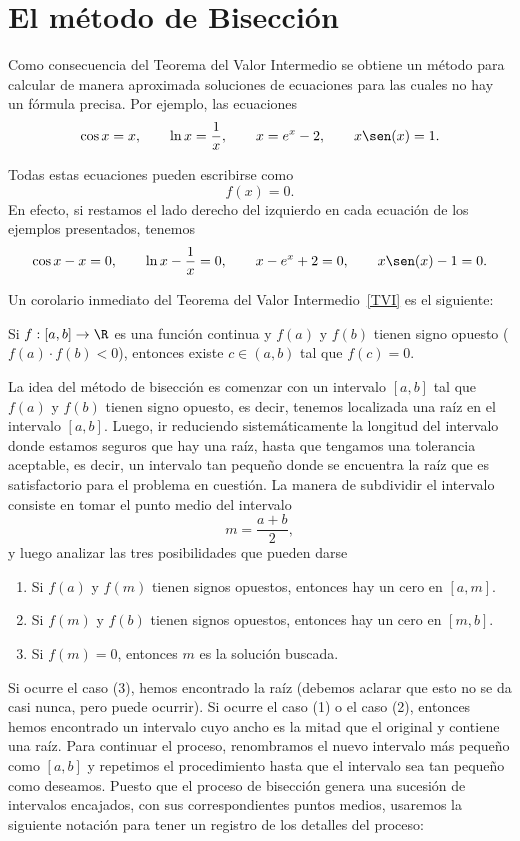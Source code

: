 \section{El método de Bisección}

Como consecuencia del Teorema del Valor Intermedio se obtiene un método para calcular de manera aproximada soluciones de ecuaciones para las cuales no hay un fórmula precisa.
Por ejemplo, las ecuaciones
\[
\cos x = x,\qquad
\ln x = \frac 1x,\qquad
x = e^x-2, \qquad
x\sen(x)=1.
\]

Todas estas ecuaciones pueden escribirse como
\begin{equation}\label{eq:ecuacion1}
f(x) = 0.
\end{equation}
En efecto, si restamos el lado derecho del izquierdo en cada ecuación de los ejemplos presentados, tenemos
\[
\cos x - x=0,\qquad
\ln x - \frac 1x=0,\qquad
x - e^x + 2=0, \qquad
x\sen(x)-1=0.
\]

Un corolario inmediato del Teorema del Valor Intermedio~\ref{TVI} es el siguiente:

\begin{corollary}
Si $f:[a,b] \to \R$ es una función continua y $f(a)$ y $f(b)$ tienen signo opuesto ($f(a)\cdot f(b) < 0$), entonces existe $c \in (a,b)$ tal que $f(c) = 0$.
\end{corollary}

La idea del método de bisección es comenzar con un intervalo $[a,b]$ tal que $f(a)$ y $f(b)$ tienen signo opuesto, es decir, tenemos localizada una raíz en el intervalo $[a,b]$. Luego, ir reduciendo sistemáticamente la longitud del intervalo donde estamos seguros que hay una raíz, hasta que tengamos una tolerancia aceptable, es decir, un intervalo tan pequeño donde se encuentra la raíz que es satisfactorio para el problema en cuestión.
La manera de subdividir el intervalo consiste en tomar el punto medio del intervalo 
\[
m = \frac{a+b}2,
\]
y luego analizar las tres posibilidades que pueden darse
\begin{enumerate}[(1)]
\item Si $f(a)$ y $f(m)$ tienen signos opuestos, entonces hay un cero en $[a,m]$.
\item Si $f(m)$ y $f(b)$ tienen signos opuestos, entonces hay un cero en $[m,b]$.
\item Si $f(m) = 0$, entonces $m$ es la solución buscada.
\end{enumerate}

Si ocurre el caso (3), hemos encontrado la raíz (debemos aclarar que esto no se da casi nunca, pero puede ocurrir).
Si ocurre el caso (1) o el caso (2), entonces hemos encontrado un intervalo cuyo ancho es la mitad que el original y contiene una raíz. Para continuar el proceso, renombramos el nuevo intervalo más pequeño como $[a,b]$ y repetimos el procedimiento hasta que el intervalo sea tan pequeño como deseamos. Puesto que el proceso de bisección genera una sucesión de intervalos encajados, con sus correspondientes puntos medios, usaremos la siguiente notación para tener un registro de los detalles del proceso:\\

